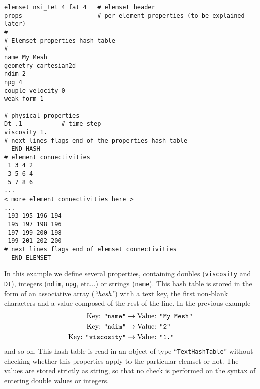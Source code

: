 \begin{verbatim}
elemset nsi_tet 4 fat 4   # elemset header 
props                     # per element properties (to be explained later)
#
# Elemset properties hash table
#
name My Mesh
geometry cartesian2d
ndim 2
npg 4
couple_velocity 0
weak_form 1

# physical properties
Dt .1           # time step
viscosity 1.
# next lines flags end of the properties hash table
__END_HASH__
# element connectivities
 1 3 4 2
 3 5 6 4
 5 7 8 6
...
< more element connectivities here >
...
 193 195 196 194
 195 197 198 196
 197 199 200 198
 199 201 202 200
# next lines flags end of elemset connectivities
__END_ELEMSET__
\end{verbatim}

In this example we define several properties, containing doubles
(\verb+viscosity+ and \verb+Dt+), integers (\verb+ndim+, \verb+npg+,
etc...) or strings (\verb+name+). This hash table is stored in the
form of an associative array (\emph{``hash''}) with a text key, the
first non-blank characters and a value composed of the rest of the
line. In the previous example
%
\begin{align}
  \textrm{Key: {\tt "name"}} &\to \textrm{Value: {\tt "My Mesh"}}\\
  \textrm{Key: {\tt "ndim"}} &\to \textrm{Value: {\tt "2"}}\\
  \textrm{Key: {\tt "viscosity"}} &\to \textrm{Value: {\tt "1."}}
\end{align}
%
and so on. This hash table is read in an object of type
``\verb+TextHashTable+'' without checking whether this properties apply
to the particular elemset or not. The values are stored strictly as
string, so that no check is performed on the syntax of entering double
values or integers. 


